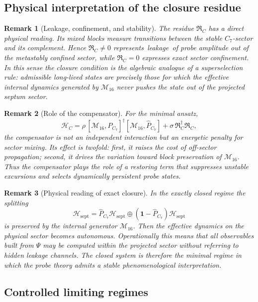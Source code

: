 \documentclass[12pt,a4paper]{article}
\newtheorem*{remark}{Remark}
\begin{document}
\subsection*{Physical interpretation of the closure residue}

\begin{remark}[Leakage, confinement, and stability]
The residue $\mathfrak R_C$ has a direct physical reading.
Its mixed blocks measure transitions between the stable $C_7$-sector and
its complement.
Hence $\mathfrak R_C\neq 0$ represents \,leakage\, of probe amplitude out
of the metastably confined sector, while $\mathfrak R_C=0$ expresses exact
sector confinement.
In this sense the closure condition is the algebraic analogue of a
superselection rule: admissible long-lived states are precisely those for
which the effective internal dynamics generated by $\mathcal M_{16}$ never
pushes the state out of the projected septum sector.
\end{remark}

\begin{remark}[Role of the compensator]
For the minimal ansatz,
\[
  \mathcal H_C
  = \rho\,[\mathcal M_{16},\hat P_{C_7}]^\dagger[\mathcal M_{16},\hat P_{C_7}]
    + \sigma\,\mathfrak R_C^\dagger\mathfrak R_C,
\]
the compensator is not an independent interaction but an energetic penalty
for sector mixing.
Its effect is twofold:
first, it raises the cost of off-sector propagation; second, it drives the
variation toward block preservation of $\mathcal M_{16}$.
Thus the compensator plays the role of a restoring term that suppresses
unstable excursions and selects dynamically persistent probe states.
\end{remark}

\begin{remark}[Physical reading of exact closure]
In the exactly closed regime the splitting
\[
  \mathcal H_{\mathrm{sept}}
  = \hat P_{C_7}\mathcal H_{\mathrm{sept}}
  \oplus
  (\mathbf 1-\hat P_{C_7})\mathcal H_{\mathrm{sept}}
\]
is preserved by the internal generator $\mathcal M_{16}$.
Then the effective dynamics on the physical sector becomes autonomous.
Operationally this means that all observables built from $\Psi$ may be
computed within the projected sector without referring to hidden leakage
channels.
The closed system is therefore the minimal regime in which the probe theory
admits a stable phenomenological interpretation.
\end{remark}

\subsection*{Controlled limiting regimes}
\end{document}
